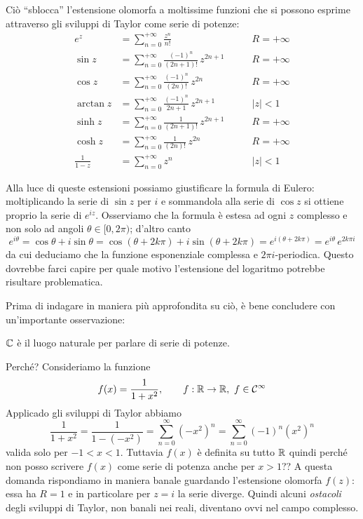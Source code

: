 Ciò ``sblocca'' l'estensione olomorfa a moltissime funzioni che si possono esprime attraverso gli sviluppi di Taylor come serie di potenze:
\begin{align*}
e^z&=\sum_{n=0}^{+\infty}\frac{z^n}{n!} \qquad &R=+\infty \\
\sin z &= \sum_{n=0}^{+\infty}\frac{(-1)^n}{(2n+1)!}\,z^{2n+1} \qquad &R=+\infty \\
\cos z &= \sum_{n=0}^{+\infty}\frac{(-1)^n}{(2n)!}\,z^{2n} \qquad &R=+\infty \\
\arctan z &= \sum_{n=0}^{+\infty}\frac{(-1)^n}{2n+1}\,z^{2n+1} \qquad &|z|<1 \\
\sinh z &= \sum_{n=0}^{+\infty}\frac{1}{(2n+1)!}\,z^{2n+1} \qquad &R=+\infty \\
\cosh z &= \sum_{n=0}^{+\infty}\frac{1}{(2n)!}\,z^{2n} \qquad &R=+\infty \\
\frac{1}{1-z}&=\sum_{n=0}^{+\infty}z^n  \qquad &|z|<1
\end{align*}

Alla luce di queste estensioni possiamo giustificare la formula di Eulero: moltiplicando la serie di $\sin z$ per $i$ e sommandola alla serie di $\cos z$ si ottiene proprio la serie di $e^{iz}$. Osserviamo che la formula è estesa ad ogni $z$ complesso e non solo ad angoli $\theta\in[0,2\pi)$; d'altro canto
$$
e^{i\theta}=\cos\theta+i\sin\theta=\cos(\theta+2k\pi)+i\sin(\theta+2k\pi)=e^{i(\theta+2k\pi)}=e^{i\theta}\,e^{2k\pi i}
$$
da cui deduciamo che la funzione esponenziale complessa e $2\pi i$-periodica. Questo dovrebbe farci capire per quale motivo l'estensione del logaritmo potrebbe risultare problematica.

Prima di indagare in maniera più approfondita su ciò, è bene concludere con un'importante osservazione:
\begin{lemma}
$\mathbb{C}$ è il luogo naturale per parlare di serie di potenze.
\end{lemma}
Perché? Consideriamo la funzione 
$$f(x)=\frac{1}{1+x^2}, \qquad f:\RR\to\RR,\ f\in\Cc^\infty$$
Applicado gli sviluppi di Taylor abbiamo
$$\frac{1}{1+x^2}=\frac{1}{1-(-x^2)}=\sum_{n=0}^\infty(-x^2)^n=\sum_{n=0}^\infty(-1)^n(x^2)^n$$
valida solo per $-1<x<1$. Tuttavia $f(x)$ è definita su tutto $\mathbb{R}$ quindi perché non posso scrivere $f(x)$ come serie di potenza anche per $x>1$?? A questa domanda rispondiamo in maniera banale guardando l'estensione olomorfa $f(z)$: essa ha $R=1$ e in particolare per $z=i$ la serie diverge. Quindi alcuni \textit{ostacoli} degli sviluppi di Taylor, non banali nei reali, diventano ovvi nel campo complesso.


